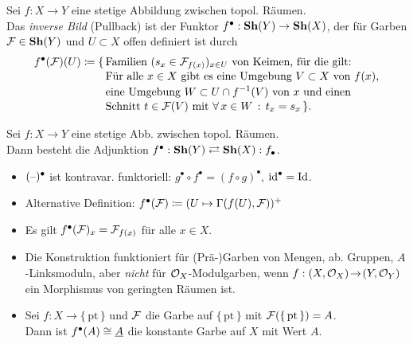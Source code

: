 \documentclass{cheat-sheet}
\newcommand{\pt}{\{ \, \mathrm{pt} \, \}} %
\begin{document}
\begin{defn}
  Sei $f : X \to Y$ eine stetige Abbildung zwischen topol. Räumen. \\
  Das \emph{inverse Bild} (Pullback) ist der Funktor $f^\bullet : \mathbf{Sh}(Y) \to \mathbf{Sh}(X)$, der für Garben $\mathcal{F} \in \mathbf{Sh}(Y)$ und $U \subset X$ offen definiert ist durch
  \begin{align*}
    f^\bullet(\mathcal{F})(U) \coloneqq \{ \, & \text{Familien $(s_x \in \mathcal{F}_{f(x)})_{x \in U}$ von Keimen, für die gilt:} \\[-2pt]
    & \text{Für alle $x \in X$ gibt es eine Umgebung $V \subset X$ von $f(x)$,} \\[-2pt]
    & \text{eine Umgebung $W \subset U \cap f^{-1}(V)$ von $x$ und einen} \\[-2pt]
    & \text{Schnitt $t \in \mathcal{F}(V)$ mit $\forall \, {x \in W} \,:\, t_x = s_x$} \, \}.
  \end{align*}
\end{defn}

\begin{prop}
  Sei $f : X \to Y$ eine stetige Abb. zwischen topol. Räumen. \\
  Dann besteht die Adjunktion \enspace $f^\bullet : \mathbf{Sh}(Y) \rightleftarrows \mathbf{Sh}(X) : f_\bullet$.
\end{prop}

\begin{bem}
  \begin{itemize}
    \item $(\text{--})^\bullet$ ist kontravar. funktoriell: $g^\bullet \circ f^\bullet = (f \circ g)^\bullet$, $\operatorname{id}^\bullet = \operatorname{Id}$.
    \item Alternative Definition: $f^\bullet(\mathcal{F}) \coloneqq (U \mapsto \Gamma(f(U), \mathcal{F}))^+$
    \item Es gilt $f^\bullet(\mathcal{F})_x = \mathcal{F}_{f(x)}$ für alle $x \in X$.
    \item Die Konstruktion funktioniert für (Prä-)Garben von Mengen, ab. Gruppen, $A$-Linksmoduln, aber {\em nicht} für $\mathcal{O}_X$-Modulgarben, wenn $f : (X, \mathcal{O}_X) \!\to\! (Y, \mathcal{O}_Y)$ ein Morphismus von geringten Räumen ist.
    \item Sei $f : X \to \pt$ und $\mathcal{F}$ die Garbe auf $\pt$ mit $\Fais(\pt) = A$. \\
    Dann ist $f^\bullet(A) \cong \underline{A}$ die konstante Garbe auf $X$ mit Wert $A$.
  \end{itemize}
\end{bem}
\end{document}

